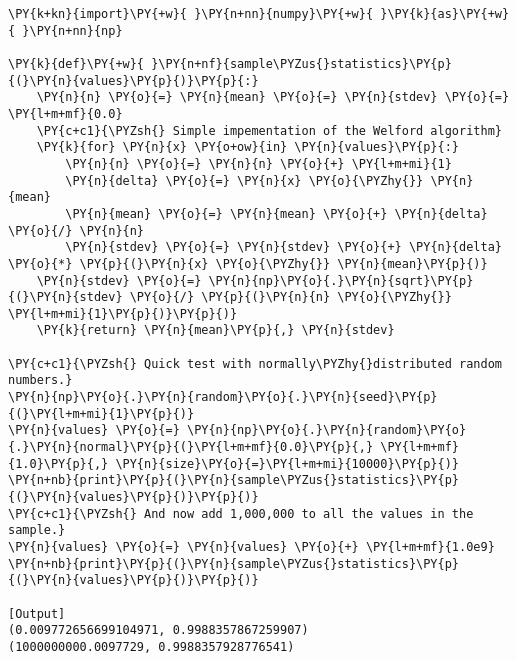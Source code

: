 \begin{Verbatim}[label=\makebox{\href{https://github.com/unipi-physics-labs/statnotes/tree/main/snippy/sample_stat3.py}{https://github.com/.../sample\_stat3.py}},commandchars=\\\{\}]
\PY{k+kn}{import}\PY{+w}{ }\PY{n+nn}{numpy}\PY{+w}{ }\PY{k}{as}\PY{+w}{ }\PY{n+nn}{np}

\PY{k}{def}\PY{+w}{ }\PY{n+nf}{sample\PYZus{}statistics}\PY{p}{(}\PY{n}{values}\PY{p}{)}\PY{p}{:}
    \PY{n}{n} \PY{o}{=} \PY{n}{mean} \PY{o}{=} \PY{n}{stdev} \PY{o}{=} \PY{l+m+mf}{0.0}
    \PY{c+c1}{\PYZsh{} Simple impementation of the Welford algorithm}
    \PY{k}{for} \PY{n}{x} \PY{o+ow}{in} \PY{n}{values}\PY{p}{:}
        \PY{n}{n} \PY{o}{=} \PY{n}{n} \PY{o}{+} \PY{l+m+mi}{1}
        \PY{n}{delta} \PY{o}{=} \PY{n}{x} \PY{o}{\PYZhy{}} \PY{n}{mean}
        \PY{n}{mean} \PY{o}{=} \PY{n}{mean} \PY{o}{+} \PY{n}{delta} \PY{o}{/} \PY{n}{n}
        \PY{n}{stdev} \PY{o}{=} \PY{n}{stdev} \PY{o}{+} \PY{n}{delta} \PY{o}{*} \PY{p}{(}\PY{n}{x} \PY{o}{\PYZhy{}} \PY{n}{mean}\PY{p}{)}
    \PY{n}{stdev} \PY{o}{=} \PY{n}{np}\PY{o}{.}\PY{n}{sqrt}\PY{p}{(}\PY{n}{stdev} \PY{o}{/} \PY{p}{(}\PY{n}{n} \PY{o}{\PYZhy{}} \PY{l+m+mi}{1}\PY{p}{)}\PY{p}{)}
    \PY{k}{return} \PY{n}{mean}\PY{p}{,} \PY{n}{stdev}

\PY{c+c1}{\PYZsh{} Quick test with normally\PYZhy{}distributed random numbers.}
\PY{n}{np}\PY{o}{.}\PY{n}{random}\PY{o}{.}\PY{n}{seed}\PY{p}{(}\PY{l+m+mi}{1}\PY{p}{)}
\PY{n}{values} \PY{o}{=} \PY{n}{np}\PY{o}{.}\PY{n}{random}\PY{o}{.}\PY{n}{normal}\PY{p}{(}\PY{l+m+mf}{0.0}\PY{p}{,} \PY{l+m+mf}{1.0}\PY{p}{,} \PY{n}{size}\PY{o}{=}\PY{l+m+mi}{10000}\PY{p}{)}
\PY{n+nb}{print}\PY{p}{(}\PY{n}{sample\PYZus{}statistics}\PY{p}{(}\PY{n}{values}\PY{p}{)}\PY{p}{)}
\PY{c+c1}{\PYZsh{} And now add 1,000,000 to all the values in the sample.}
\PY{n}{values} \PY{o}{=} \PY{n}{values} \PY{o}{+} \PY{l+m+mf}{1.0e9}
\PY{n+nb}{print}\PY{p}{(}\PY{n}{sample\PYZus{}statistics}\PY{p}{(}\PY{n}{values}\PY{p}{)}\PY{p}{)}

[Output]
(0.009772656699104971, 0.9988357867259907)
(1000000000.0097729, 0.9988357928776541)
\end{Verbatim}
